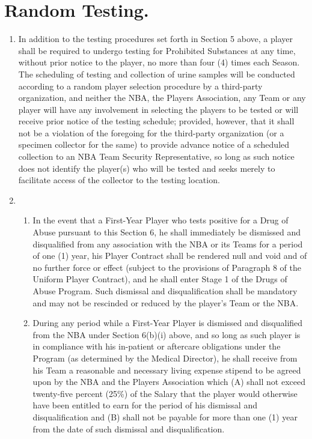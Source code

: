 \documentclass[
]{book}
\providecommand{\tightlist}{%
  \setlength{\itemsep}{0pt}\setlength{\parskip}{0pt}}
\begin{document}
\hypertarget{random-testing.}{%
\section{Random Testing.}\label{random-testing.}}

\begin{enumerate}
\def\labelenumi{(\alph{enumi})}
\item
  In addition to the testing procedures set forth in Section 5 above, a player shall be required to undergo testing for Prohibited Substances at any time, without prior notice to the player, no more than four (4) times each Season. The scheduling of testing and collection of urine samples will be conducted according to a random player selection procedure by a third-party organization, and neither the NBA, the Players Association, any Team or any player will have any involvement in selecting the players to be tested or will receive prior notice of the testing schedule; provided, however, that it shall not be a violation of the foregoing for the third-party organization (or a specimen collector for the same) to provide advance notice of a scheduled collection to an NBA Team Security Representative, so long as such notice does not identify the player(s) who will be tested and seeks merely to facilitate access of the collector to the testing location.
\item
  \begin{enumerate}
  \def\labelenumii{(\roman{enumii})}
  \tightlist
  \item
    In the event that a First-Year Player who tests positive for a Drug of Abuse pursuant to this Section 6, he shall immediately be dismissed and disqualified from any association with the NBA or its Teams for a period of one (1) year, his Player Contract shall be rendered null and void and of no further force or effect (subject to the provisions of Paragraph 8 of the Uniform Player Contract), and he shall enter Stage 1 of the Drugs of Abuse Program. Such dismissal and disqualification shall be mandatory and may not be rescinded or reduced by the player's Team or the NBA.
  \item
    During any period while a First-Year Player is dismissed and disqualified from the NBA under Section 6(b)(i) above, and so long as such player is in compliance with his in-patient or aftercare obligations under the Program (as determined by the Medical Director), he shall receive from his Team a reasonable and necessary living expense stipend to be agreed upon by the NBA and the Players Association which (A) shall not exceed twenty-five percent (25\%) of the Salary that the player would otherwise have been entitled to earn for the period of his dismissal and disqualification and (B) shall not be payable for more than one (1) year from the date of such dismissal and disqualification.

\end{enumerate}
\end{enumerate}
\end{document}

